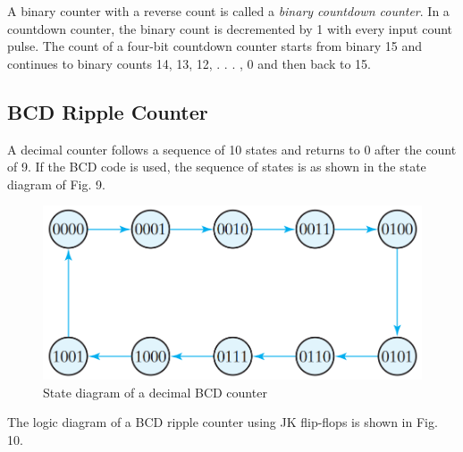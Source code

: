 A binary counter with a reverse count is called a \textit{binary countdown counter}. In a countdown counter, the binary count is decremented by 1 with every input count pulse. The count of a four-bit countdown counter starts from binary 15 and continues to binary counts 14, 13, 12, . . . , 0 and then back to 15.

\newpage

\subsection{BCD Ripple Counter}
\label{subsec:bcd-ripple-counter}

A decimal counter follows a sequence of 10 states and returns to 0 after the count of 9. If the BCD code is used, the sequence of states is as shown in the state diagram of Fig. 9.

\begin{figure}[H]
  \centering
  \includegraphics[width=\linewidth]{img/fig-6.9.png}
  \caption{State diagram of a decimal BCD counter}
  \label{fig:6.9}
\end{figure}

\noindent The logic diagram of a BCD ripple counter using JK flip-flops is shown in Fig. 10.


